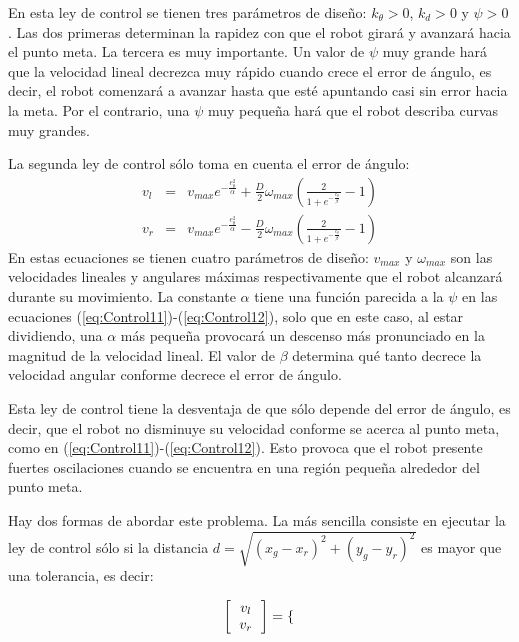 \documentclass[letterpaper,12pt]{article}
\begin{document}
En esta ley de control se tienen tres parámetros de diseño: $k_{\theta}>0$, $k_d>0$ y $\psi>0$. Las dos primeras determinan la rapidez con que el robot girará y avanzará hacia el punto meta. La tercera es muy importante. Un valor de $\psi$ muy grande hará que la velocidad lineal decrezca muy rápido cuando crece el error de ángulo, es decir, el robot comenzará a avanzar hasta que esté apuntando casi sin error hacia la meta. Por el contrario, una $\psi$ muy pequeña hará que el robot describa curvas muy grandes.  

La segunda ley de control sólo toma en cuenta el error de ángulo:
\begin{eqnarray} 
v_{l} &=& v_{max}e^{-\frac{e_{\theta}^{2}}{\alpha}} + 
\frac{D}{2}\omega_{max}\left(\frac{2}{1+e^{-\frac{e_{\theta}}{\beta}}}-1\right)\label{eq:Control21}\\
v_{r} &=& v_{max}e^{-\frac{e_{\theta}^{2}}{\alpha}} -
\frac{D}{2}\omega_{max}\left(\frac{2}{1+e^{-\frac{e_{\theta}}{\beta}}}-1\right)\label{eq:Control22}
\end{eqnarray}
En estas ecuaciones se tienen cuatro parámetros de diseño: $v_{max}$ y $\omega_{max}$ son las velocidades lineales y angulares máximas respectivamente que el robot alcanzará durante su movimiento. La constante $\alpha$ tiene una función parecida a la $\psi$ en las ecuaciones (\ref{eq:Control11})-(\ref{eq:Control12}), solo que en este caso, al estar dividiendo, una $\alpha$ más pequeña provocará un descenso más pronunciado en la magnitud de la velocidad lineal. El valor de $\beta$ determina qué tanto decrece la velocidad angular conforme decrece el error de ángulo. 

Esta ley de control tiene la desventaja de que sólo depende del error de ángulo, es decir, que el robot no disminuye su velocidad conforme se acerca al punto meta, como en (\ref{eq:Control11})-(\ref{eq:Control12}). Esto provoca que el robot presente fuertes oscilaciones cuando se encuentra en una región pequeña alrededor del punto meta.

Hay dos formas de abordar este problema. La más sencilla consiste en ejecutar la ley de control sólo si la distancia $d=\sqrt{(x_g - x_r)^2 + (y_g - y_r)^2}$ es mayor que una tolerancia, es decir:

\[
  \left[\begin{tabular}{c}$v_l$ \\ $v_r$ \end{tabular}\right] =
  \begin{cases}
    
    \end{cases}
\]
\end{document}
